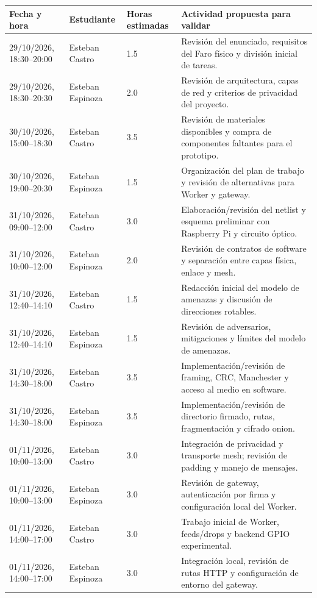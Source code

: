 \documentclass[12pt,a4paper]{article}
\begin{document}
\begin{longtable}{p{}p{}p{}p{}}
\toprule
\textbf{Fecha y hora} & \textbf{Estudiante} & \textbf{Horas estimadas} & \textbf{Actividad propuesta para validar}\\
\midrule
\endhead
29/10/2026, 18:30--20:00 & Esteban Castro & 1.5 & Revisión del enunciado, requisitos del Faro físico y división inicial de tareas.\\
29/10/2026, 18:30--20:30 & Esteban Espinoza & 2.0 & Revisión de arquitectura, capas de red y criterios de privacidad del proyecto.\\
30/10/2026, 15:00--18:30 & Esteban Castro & 3.5 & Revisión de materiales disponibles y compra de componentes faltantes para el prototipo.\\
30/10/2026, 19:00--20:30 & Esteban Espinoza & 1.5 & Organización del plan de trabajo y revisión de alternativas para Worker y gateway.\\
31/10/2026, 09:00--12:00 & Esteban Castro & 3.0 & Elaboración/revisión del netlist y esquema preliminar con Raspberry Pi y circuito óptico.\\
31/10/2026, 10:00--12:00 & Esteban Espinoza & 2.0 & Revisión de contratos de software y separación entre capas física, enlace y mesh.\\
31/10/2026, 12:40--14:10 & Esteban Castro & 1.5 & Redacción inicial del modelo de amenazas y discusión de direcciones rotables.\\
31/10/2026, 12:40--14:10 & Esteban Espinoza & 1.5 & Revisión de adversarios, mitigaciones y límites del modelo de amenazas.\\
31/10/2026, 14:30--18:00 & Esteban Castro & 3.5 & Implementación/revisión de framing, CRC, Manchester y acceso al medio en software.\\
31/10/2026, 14:30--18:00 & Esteban Espinoza & 3.5 & Implementación/revisión de directorio firmado, rutas, fragmentación y cifrado onion.\\
01/11/2026, 10:00--13:00 & Esteban Castro & 3.0 & Integración de privacidad y transporte mesh; revisión de padding y manejo de mensajes.\\
01/11/2026, 10:00--13:00 & Esteban Espinoza & 3.0 & Revisión de gateway, autenticación por firma y configuración local del Worker.\\
01/11/2026, 14:00--17:00 & Esteban Castro & 3.0 & Trabajo inicial de Worker, feeds/drops y backend GPIO experimental.\\
01/11/2026, 14:00--17:00 & Esteban Espinoza & 3.0 & Integración local, revisión de rutas HTTP y configuración de entorno del gateway.\\

\end{longtable}
\end{document}
